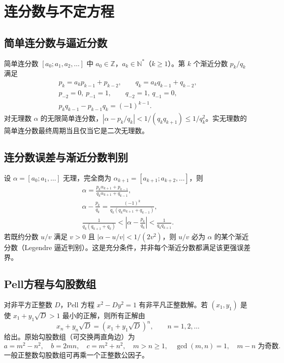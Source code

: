 \documentclass[../main.tex]{subfiles}
\begin{document}
\section{连分数与不定方程}
\subsection{简单连分数与逼近分数}
简单连分数 $[a_0;a_1,a_2,\ldots]$ 中 $a_0\in\mathbb Z$，$a_k\in\mathbb N^*$（$k\ge1$）。第 $k$ 个渐近分数 $p_k/q_k$ 满足
\begin{gather*}
p_k=a_kp_{k-1}+p_{k-2},\qquad q_k=a_kq_{k-1}+q_{k-2},\\
p_{-2}=0,\ p_{-1}=1,\qquad q_{-2}=1,\ q_{-1}=0,\\
p_kq_{k-1}-p_{k-1}q_k=(-1)^{k-1}.
\end{gather*}
对无理数 $\alpha$ 的无限简单连分数，$|\alpha-p_k/q_k|<1/(q_kq_{k+1})\le1/q_k^2$。实无理数的简单连分数最终周期当且仅当它是二次无理数。
\subsection{连分数误差与渐近分数判别}
设 $\alpha=[a_0;a_1,\ldots]$ 无理，完全商为 $\alpha_{k+1}=[a_{k+1};a_{k+2},\ldots]$，则
\begin{gather*}
\alpha=\frac{p_k\alpha_{k+1}+p_{k-1}}{q_k\alpha_{k+1}+q_{k-1}},\\
\alpha-\frac{p_k}{q_k}
=\frac{(-1)^k}{q_k(q_k\alpha_{k+1}+q_{k-1})},\\
\frac1{q_k(q_{k+1}+q_k)}
<\left|\alpha-\frac{p_k}{q_k}\right|
<\frac1{q_kq_{k+1}}.
\end{gather*}
若既约分数 $u/v$ 满足 $v>0$ 且 $|\alpha-u/v|<1/(2v^2)$，则 $u/v$ 必为 $\alpha$ 的某个渐近分数（Legendre 逼近判别）。这是充分条件，并非每个渐近分数都满足该更强误差界。
\par\begin{samepage}
\subsection{Pell方程与勾股数组}
对非平方正整数 $D$，Pell 方程 $x^2-Dy^2=1$ 有非平凡正整数解。若 $(x_1,y_1)$ 是使 $x_1+y_1\sqrt D>1$ 最小的正解，则所有正解由
\[
x_n+y_n\sqrt D=(x_1+y_1\sqrt D)^n,\qquad n=1,2,\ldots
\]
给出。原始勾股数组（可交换两直角边）为
\[
a=m^2-n^2,\quad b=2mn,\quad c=m^2+n^2,
\quad m>n\ge1,\quad\gcd(m,n)=1,\quad m-n\text{ 为奇数}.
\]
一般正整数勾股数组可再乘一个正整数公因子。
\par\end{samepage}
\end{document}
